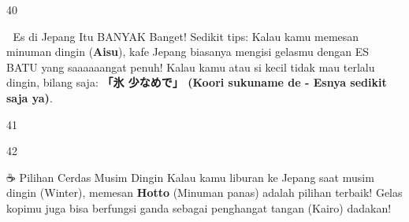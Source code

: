 \begin{convobox}{40}
    \noindent
      
      

    \vspace{1.5em}
\end{convobox}

\begin{lessonbox}{🧊 Es di Jepang Itu BANYAK Banget!}
    Sedikit tips: Kalau kamu memesan minuman dingin (\textbf{Aisu}), kafe Jepang biasanya mengisi gelasmu dengan ES BATU yang saaaaaangat penuh! Kalau kamu atau si kecil tidak mau terlalu dingin, bilang saja: \textbf{「氷 少なめで」 (Koori sukuname de - Esnya sedikit saja ya)}.
\end{lessonbox}

\begin{convobox}{41}
    \noindent
      
      

    \vspace{1.5em}
\end{convobox}

\begin{convobox}{42}
    \noindent
     

    \vspace{1.5em}
\end{convobox}

\begin{lessonbox}{☕ Pilihan Cerdas Musim Dingin}
    Kalau kamu liburan ke Jepang saat musim dingin (Winter), memesan \textbf{Hotto} (Minuman panas) adalah pilihan terbaik! Gelas kopimu juga bisa berfungsi ganda sebagai penghangat tangan (Kairo) dadakan!
\end{lessonbox}

